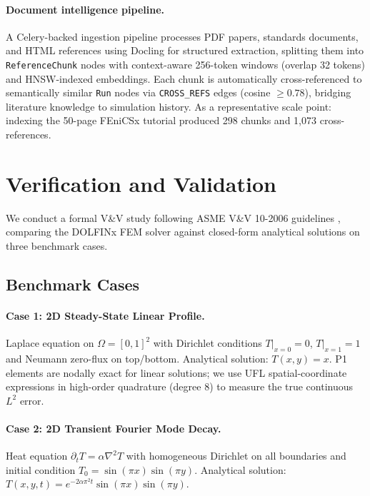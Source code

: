 \documentclass[preprint,review,12pt]{elsarticle}
\begin{document}
\paragraph{Document intelligence pipeline.}
A Celery-backed ingestion pipeline processes PDF papers, standards documents,
and HTML references using Docling \citep{docling2024} for structured
extraction, splitting them into \texttt{ReferenceChunk} nodes with
context-aware 256-token windows (overlap 32 tokens) and HNSW-indexed
embeddings.  Each chunk is automatically cross-referenced to semantically
similar \texttt{Run} nodes via \texttt{CROSS\_REFS} edges (cosine
$\ge 0.78$), bridging literature knowledge to simulation history.
As a representative scale point: indexing the 50-page FEniCSx tutorial
produced 298 chunks and 1{,}073 cross-references.

\section{Verification and Validation}
\label{sec:vv}

We conduct a formal V\&V study following ASME V\&V 10-2006 guidelines
\citep{asme2006vv}, comparing the DOLFINx FEM solver against closed-form
analytical solutions on three benchmark cases.

\subsection{Benchmark Cases}

\paragraph{Case 1: 2D Steady-State Linear Profile.}
Laplace equation on $\Omega = [0,1]^2$ with Dirichlet conditions
$T|_{x=0} = 0$, $T|_{x=1} = 1$ and Neumann zero-flux on top/bottom.
Analytical solution: $T(x,y) = x$.  P1 elements are nodally exact for
linear solutions; we use UFL spatial-coordinate expressions in high-order
quadrature (degree 8) to measure the true continuous $L^2$ error.

\paragraph{Case 2: 2D Transient Fourier Mode Decay.}
Heat equation $\partial_t T = \alpha \nabla^2 T$ with homogeneous Dirichlet
on all boundaries and initial condition $T_0 = \sin(\pi x)\sin(\pi y)$.
Analytical solution: $T(x,y,t) = e^{-2\alpha\pi^2 t}\sin(\pi x)\sin(\pi y)$.
\end{document}
